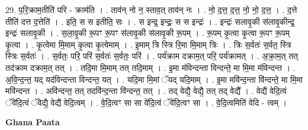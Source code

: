 \documentclass[17pt]{extarticle}
\begin{document}
29. प॒रि॒क्राम॒तीति॑ परि - क्राम॑ति । . ताव॑न् नो न॒ स्ताव॒त् ताव॑न् नः । . नो॒ द॒त्त॒ द॒त्त॒ नो॒ नो॒ द॒त्त॒ । . द॒त्ते तीति॑ दत्त द॒त्तेति॑ । . इति॒ स स इतीति॒ सः । . स इन्द्र॒ इन्द्रः॒ स स इन्द्रः॑ । . इन्द्रः॑ सलावृ॒की स॑लावृ॒कीन्द्र॒ इन्द्रः॑ सलावृ॒की । . स॒ला॒वृ॒की रू॒पꣳ रू॒पꣳ स॑लावृ॒की स॑लावृ॒की रू॒पम् । . रू॒पम् कृ॒त्वा कृ॒त्वा रू॒पꣳ रू॒पम् कृ॒त्वा । . कृ॒त्वेमा मि॒माम् कृ॒त्वा कृ॒त्वेमाम् । . इ॒माम् त्रि स्त्रि रि॒मा मि॒माम् त्रिः । . त्रिः स॒र्वतः॑ स॒र्वत॒ स्त्रि स्त्रिः स॒र्वतः॑ । . स॒र्वतः॒ परि॒ परि॑ स॒र्वतः॑ स॒र्वतः॒ परि॑ । . पर्य॑क्राम दक्राम॒त् परि॒ पर्य॑क्रामत् । . अ॒क्रा॒म॒त् तत् तद॑क्राम दक्राम॒त् तत् । . तदि॒मा मि॒माम् तत् तदि॒माम् । . इ॒मा म॑विन्दन्ता विन्दन्ते॒ मा मि॒मा म॑विन्दन्त । . अ॒वि॒न्द॒न्त॒ यद् यद॑विन्दन्ता विन्दन्त॒ यत् । . यदि॒मा मि॒मां ॅयद् यदि॒माम् । . इ॒मा मवि॑न्द॒न्ता वि॑न्दन्ते॒ मा मि॒मा मवि॑न्दन्त । . अवि॑न्दन्त॒ तत् तदवि॑न्द॒न्ता वि॑न्दन्त॒ तत् । . तद् वेद्यै॒ वेद्यै॒ तत् तद् वेद्यै᳚ । . वेद्यै॑ वेदि॒त्वं ॅवे॑दि॒त्वं ॅवेद्यै॒ वेद्यै॑ वेदि॒त्वम् । . वे॒दि॒त्वꣳ सा सा वे॑दि॒त्वं ॅवे॑दि॒त्वꣳ सा । . वे॒दि॒त्वमिति॑ वेदि - त्वम् । \newline

\textbf{Ghana Paata } \newline
\end{document}
